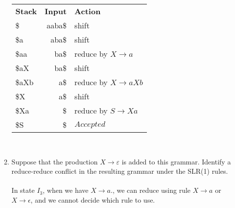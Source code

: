 \documentclass[10pt]{article}
\begin{document}
\begin{enumerate}
\begin{enumerate}
\begin{table}[ht]
\begin{center}
\begin{tabular}{l|r|l}
	\textbf{Stack} & \textbf{Input} & \textbf{Action} \\ 
	\$ & aaba\$ & shift \\ 
	\$a & aba\$ & shift \\ 
	\$aa & ba\$ & reduce by $X\rightarrow a$ \\ 
	\$aX & ba\$ & shift \\ 
	\$aXb & a\$ & reduce by $X\rightarrow aXb$ \\ 
	\$X & a\$ & shift\\
	\$Xa & \$ & reduce by $S\rightarrow Xa$ \\ 
	\$S & \$ &  $Accepted$\\ 
	\end{tabular}\end{center}
	\end{table}
	\\
\item Suppose that the production $X \rightarrow \varepsilon$ is added
to this grammar.  Identify a reduce-reduce conflict in the resulting
grammar under the SLR(1) rules. 
	\\ \\
	In state $I_3$, when we have $X\rightarrow a.$, we can reduce using rule
	$X\rightarrow a$ or $X\rightarrow \epsilon$, and we cannot decide which
	rule to use. 
	\\
\end{enumerate}
\end{enumerate}
\end{document}
